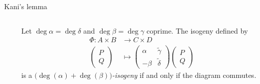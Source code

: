 \documentclass[aspectratio=169]{beamer}
\newcommand{\Q}{ℚ}
\begin{document}
\begin{frame}{Kani's lemma}
  \large
  \begin{columns}
    \begin{column}{0.4\textwidth}
      \centering
    \end{column}
    \begin{column}{0.5\textwidth}
      Let $\deg α = \deg δ$ and $\deg β = \deg γ$ coprime.  The
      isogeny defined by
      \begin{align*}
        Φ : A×B &→ C×D\\
        \begin{pmatrix}
          P\\Q
        \end{pmatrix}
            &↦
                \begin{pmatrix}
                  α & \tilde{γ}\\
                  -β & \tilde{δ}
                \end{pmatrix}
                \begin{pmatrix}
                  P\\Q
                \end{pmatrix}
      \end{align*}      
      is a \emph{$\bigl(\deg(α) + \deg(β)\bigl)$-isogeny} if and only
      if the diagram commutes.

      \bigskip
      
    \end{column}
  \end{columns}
\end{frame}

\end{document}
